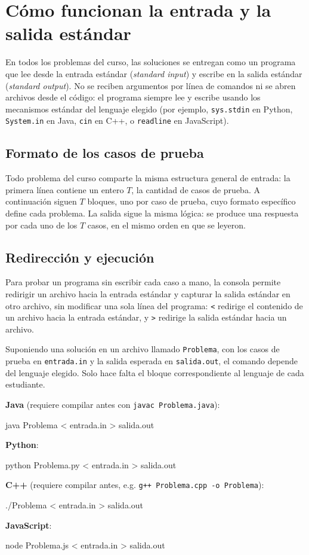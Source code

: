 \section{Cómo funcionan la entrada y la salida estándar}
En todos los problemas del curso, las soluciones se entregan como un programa que lee desde la entrada estándar (\textit{standard input}) y escribe en la salida estándar (\textit{standard output}). No se reciben argumentos por línea de comandos ni se abren archivos desde el código: el programa siempre lee y escribe usando los mecanismos estándar del lenguaje elegido (por ejemplo, \texttt{sys.stdin} en Python, \texttt{System.in} en Java, \texttt{cin} en C++, o \texttt{readline} en JavaScript).

\subsection{Formato de los casos de prueba}
Todo problema del curso comparte la misma estructura general de entrada: la primera línea contiene un entero $T$, la cantidad de casos de prueba. A continuación siguen $T$ bloques, uno por caso de prueba, cuyo formato específico define cada problema. La salida sigue la misma lógica: se produce una respuesta por cada uno de los $T$ casos, en el mismo orden en que se leyeron.

\subsection{Redirección y ejecución}
Para probar un programa sin escribir cada caso a mano, la consola permite redirigir un archivo hacia la entrada estándar y capturar la salida estándar en otro archivo, sin modificar una sola línea del programa: \texttt{<} redirige el contenido de un archivo hacia la entrada estándar, y \texttt{>} redirige la salida estándar hacia un archivo.

Suponiendo una solución en un archivo llamado \texttt{Problema}, con los casos de prueba en \texttt{entrada.in} y la salida esperada en \texttt{salida.out}, el comando depende del lenguaje elegido. Solo hace falta el bloque correspondiente al lenguaje de cada estudiante.

\textbf{Java} (requiere compilar antes con \texttt{javac Problema.java}):
\begin{pseudocode}
java Problema < entrada.in > salida.out
\end{pseudocode}

\textbf{Python}:
\begin{pseudocode}
python Problema.py < entrada.in > salida.out
\end{pseudocode}

\textbf{C++} (requiere compilar antes, e.g. \texttt{g++ Problema.cpp -o Problema}):
\begin{pseudocode}
./Problema < entrada.in > salida.out
\end{pseudocode}

\textbf{JavaScript}:
\begin{pseudocode}
node Problema.js < entrada.in > salida.out
\end{pseudocode}
